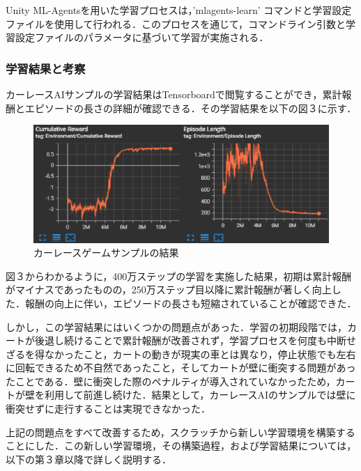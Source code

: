 Unity ML-Agentsを用いた学習プロセスは，'mlagents-learn' コマンドと学習設定ファイルを使用して行われる．このプロセスを通じて，コマンドライン引数と学習設定ファイルのパラメータに基づいて学習が実施される．

\subsubsection{学習結果と考察}
カーレースAIサンプルの学習結果はTensorboardで閲覧することができ，累計報酬とエピソードの長さの詳細が確認できる．その学習結果を以下の図３に示す．

\begin{figure}[H]
    \centering
    \includegraphics[width=1\textwidth]{figures/Tensorboard.eps}
    \caption{カーレースゲームサンプルの結果}
    \label{fig:sample-graph}
\end{figure}


図３からわかるように，400万ステップの学習を実施した結果，初期は累計報酬がマイナスであったものの，250万ステップ目以降に累計報酬が著しく向上した．報酬の向上に伴い，エピソードの長さも短縮されていることが確認できた．

しかし，この学習結果にはいくつかの問題点があった．学習の初期段階では，カートが後退し続けることで累計報酬が改善されず，学習プロセスを何度も中断せざるを得なかったこと，カートの動きが現実の車とは異なり，停止状態でも左右に回転できるため不自然であったこと，そしてカートが壁に衝突する問題があったことである．壁に衝突した際のペナルティが導入されていなかったため，カートが壁を利用して前進し続けた．結果として，カーレースAIのサンプルでは壁に衝突せずに走行することは実現できなかった．

上記の問題点をすべて改善するため，スクラッチから新しい学習環境を構築することにした．この新しい学習環境，その構築過程，および学習結果については，以下の第３章以降で詳しく説明する．
